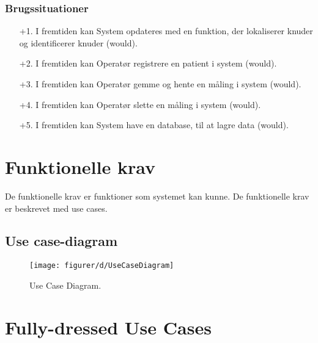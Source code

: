\subsubsection{Brugssituationer}
\begin{enumerate}
    \item[+1.] I fremtiden kan System opdateres med en funktion, der lokaliserer knuder og identificerer knuder (would).
    \item[+2.] I fremtiden kan Operatør registrere en patient i system (would). 
    \item[+3.] I fremtiden kan Operatør gemme og hente en måling i system (would).  
    \item[+4.] I fremtiden kan Operatør slette en måling i system (would). 
    \item[+5.] I fremtiden kan System have en database, til at lagre data (would).
\end{enumerate}

\section{Funktionelle krav}\label{afsFunk}
De funktionelle krav er funktioner som systemet kan kunne. De funktionelle krav er beskrevet med use cases. 

\subsection{Use case-diagram}
\begin{figure}[H]
    \centering
    \texttt{[image: figurer/d/UseCaseDiagram]}
    \caption{Use Case Diagram.}
    \label{UseCaseDiagram}
\end{figure}

\section{Fully-dressed Use Cases}
\pagebreak
